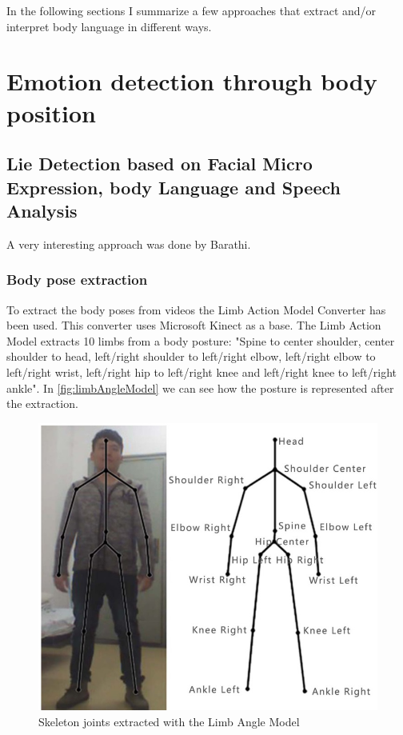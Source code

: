 \documentclass[conference]{IEEEtran}
\begin{document}
In the following sections I summarize a few approaches that extract and/or interpret body language in different ways. 


\section{Emotion detection through body position}
\label{sec:emotionBodyMovementPos}
\subsection{Lie Detection based on Facial Micro Expression, body Language and Speech Analysis}
\label{subsec:lieDetectionLAM}
A very interesting approach was done by Barathi\cite{barathi2016lie}. 
\subsubsection{Body pose extraction}
To extract the body poses from videos the Limb Action Model Converter\cite{du20143d} has been used. This converter uses Microsoft Kinect as a base. 
The Limb Action Model extracts 10 limbs from a body posture: "Spine to center shoulder, center shoulder to head, left/right shoulder to left/right elbow, left/right elbow to left/right wrist, left/right hip to left/right knee and left/right knee to left/right ankle"\cite{du20143d}. In \autoref{fig:limbAngleModel} we can see how the posture is represented after the extraction.

\begin{figure}[H]
\centering
\includegraphics[width=\linewidth]{limbAngleModel.jpg}
\caption{Skeleton joints extracted with the Limb Angle Model\cite{du20143d}}
\label{fig:limbAngleModel}
\end{figure}
\end{document}
